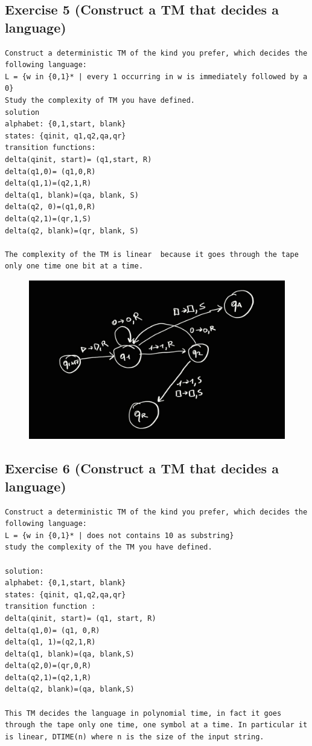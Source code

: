 \subsection{Exercise 5 (Construct a TM that decides a language)}
\begin{lstlisting}[breaklines]
Construct a deterministic TM of the kind you prefer, which decides the following language:
L = {w in {0,1}* | every 1 occurring in w is immediately followed by a 0}
Study the complexity of TM you have defined.
solution 
alphabet: {0,1,start, blank}
states: {qinit, q1,q2,qa,qr}
transition functions:
delta(qinit, start)= (q1,start, R)
delta(q1,0)= (q1,0,R)
delta(q1,1)=(q2,1,R)
delta(q1, blank)=(qa, blank, S)
delta(q2, 0)=(q1,0,R)
delta(q2,1)=(qr,1,S)
delta(q2, blank)=(qr, blank, S)

The complexity of the TM is linear  because it goes through the tape only one time one bit at a time.
\end{lstlisting}
\begin{figure}[H]
	\centerline{\includegraphics[scale=0.2]{figures/old/TM_2}}
\end{figure}
\subsection{Exercise 6 (Construct a TM that decides a language)}

\begin{lstlisting}[breaklines]
Construct a deterministic TM of the kind you prefer, which decides the following language:
L = {w in {0,1}* | does not contains 10 as substring}
study the complexity of the TM you have defined.

solution:
alphabet: {0,1,start, blank}
states: {qinit, q1,q2,qa,qr}
transition function :
delta(qinit, start)= (q1, start, R)
delta(q1,0)= (q1, 0,R)
delta(q1, 1)=(q2,1,R)
delta(q1, blank)=(qa, blank,S)
delta(q2,0)=(qr,0,R)
delta(q2,1)=(q2,1,R)
delta(q2, blank)=(qa, blank,S)

This TM decides the language in polynomial time, in fact it goes through the tape only one time, one symbol at a time. In particular it is linear, DTIME(n) where n is the size of the input string.
\end{lstlisting}

